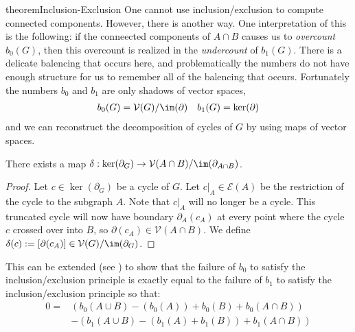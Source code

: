 \begin{doubledpage}{theorem}{Inclusion-Exclusion}{
	One cannot use inclusion/exclusion to compute connected components. However, there is another way.  }
One interpretation of this is the following: if the conneected components of $A\cap B$ causes us to \emph{overcount $b_0(G)$}, then this overcount is realized in the \emph{undercount} of $b_1(G)$.
There is a delicate balencing that occurs here, and problematically the numbers do not have enough structure for us to remember all of the balencing that occurs. 
Fortunately the numbers $b_0$ and $b_1$ are only shadows of vector spaces, 
\begin{align*}b_0(G)= \mathcal V(G)/\im(\partial) && b_1(G)= \ker(\partial)\end{align*} 
and we can reconstruct the decomposition of cycles of $G$ by using maps of vector spaces. 
\begin{claim}
	There exists a map $\delta: \ker(\partial_G)\to \mathcal V(A\cap B)/\im(\partial_{A\cap B}) $.
\end{claim}
\begin{proof}
	Let $c\in \ker(\partial_G)$ be a cycle of $G$. Let $c|_A\in \mathcal E(A)$ be the restriction of the cycle to the subgraph $A$. Note that $c|_A$ will no longer be a cycle. This truncated cycle  will now have boundary $\partial_A(c_A)$ at every point where the cycle $c$ crossed over into $B$, so $\partial(c_A)\in \mathcal V(A\cap B)$. We define $\delta(c):=[\partial(c_A)]\in \mathcal V(G)/\im(\partial_G)$. 
\end{proof}
This can be extended (see ) to show that the failure of $b_0$ to satisfy the inclusion/exclusion principle is exactly equal to the failure of $b_1$ to satisfy the inclusion/exclusion principle so that:
\begin{align*}
0=&\left(b_0(A\cup B)-(b_0(A))+b_0(B)+b_0(A\cap B)\right)\\
&-\left(b_1(A\cup B)-(b_1(A)+b_1(B))+b_1(A\cap B)\right)
\end{align*}
\end{doubledpage}
